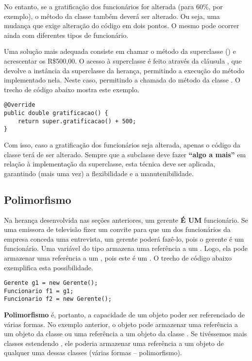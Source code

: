 No entanto, se a gratificação dos funcionários for alterada (para 60\%, por exemplo), o método da classe  também deverá ser alterado. Ou seja, uma mudança que exige alteração do código em dois pontos. O mesmo pode ocorrer ainda com diferentes tipos de funcionário.

Uma solução mais adequada consiste em chamar o método  da superclasse () e acrescentar os R\$500,00. O acesso à superclasse é feito através da cláusula , que devolve a instância da superclasse da herança, permitindo a execução do método implementado nela. Neste caso, permitindo a chamada do método  da classe . O trecho de código abaixo mostra este exemplo.

\begin{verbatim}
@Override
public double gratificacao() {
	return super.gratificacao() + 500;
}
\end{verbatim}

Com isso, caso a gratificação dos funcionários seja alterada, apenas o código da classe  terá de ser alterado. Sempre que a subclasse deve fazer \textbf{``algo a mais''} em relação à implementação da superclasse, esta técnica deve ser aplicada, garantindo (mais uma vez) a flexibilidade e a manutenibilidade.


\subsection{Polimorfismo}
 
Na herança desenvolvida nas seções anteriores, um gerente \textbf{É UM} funcionário. Se uma emissora de televisão fizer um convite para que um dos funcionários da empresa conceda uma entrevista, um gerente poderá fazê-lo, pois o gerente é um funcionário. Uma variável do tipo  armazena uma referência a um . Logo, ela pode armazenar uma referência a um , pois este é um . O trecho de código abaixo exemplifica esta possibilidade.

\begin{verbatim}
Gerente g1 = new Gerente();
Funcionario f1 = g1;
Funcionario f2 = new Gerente();
\end{verbatim}

\textbf{Polimorfismo} é, portanto, a capacidade de um objeto poder ser referenciado de várias formas. No exemplo anterior, o objeto  pode armazenar uma referência a um objeto da classe  ou uma referência a um objeto da classe . Se tivéssemos mais classes estendendo , ele poderia armazenar uma referência a um objeto de qualquer uma dessas classes (várias formas -- polimorfismo).

